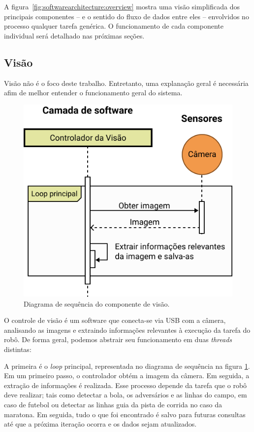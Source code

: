A figura~\ref{fig:softwarearchitecture:overview} mostra uma visão simplificada dos principais componentes -- e o sentido do fluxo de dados entre eles -- envolvidos no processo qualquer tarefa genérica. O funcionamento de cada componente individual será detalhado nas próximas seções.

\subsection{Visão}

Visão não é o foco deste trabalho. Entretanto, uma explanação geral é necessária afim de melhor entender o funcionamento geral do sistema.

\begin{figure}[h!]
	\centering
	\includegraphics[scale=1]{imagens/svg/softwarearchitecture-vision}
	\caption{Diagrama de sequência do componente de visão.}
	\label{fig:softwarearchitecture:vision}
\end{figure}

O controle de visão é um software que conecta-se via USB com a câmera, analisando as imagens e extraindo informações relevantes à execução da tarefa do robô. De forma geral, podemos abstrair seu funcionamento em duas \textit{threads} distintas:

A primeira é o \textit{loop} principal, representada no diagrama de sequência na figura \ref{fig:softwarearchitecture:vision}. Em um primeiro passo, o controlador obtém a imagem da câmera. Em seguida, a extração de informações é realizada. Esse processo depende da tarefa que o robô deve realizar; tais como detectar a bola, os adversários e as linhas do campo, em caso de futebol ou detectar as linhas guia da pista de corrida no caso da maratona. Em seguida, tudo o que foi encontrado é salvo para futuras consultas até que a próxima iteração ocorra e os dados sejam atualizados.

